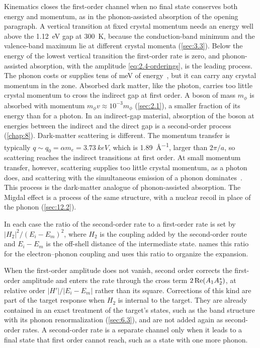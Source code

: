 Kinematics closes the first-order channel when no final state conserves both energy and momentum, as in the phonon-assisted absorption of the opening paragraph. A vertical transition at fixed crystal momentum needs an energy well above the \SI{1.12}{eV} gap at \SI{300}{K}, because the conduction-band minimum and the valence-band maximum lie at different crystal momenta (\cref{sec:3.3}). Below the energy of the lowest vertical transition the first-order rate is zero, and phonon-assisted absorption, with the amplitude \cref{eq:2.4-orderings}, is the leading process. The phonon costs or supplies tens of meV of energy~\cite[Table~I]{kahn2022searches}, but it can carry any crystal momentum in the zone. Absorbed dark matter, like the photon, carries too little crystal momentum to cross the indirect gap at first order. A boson of mass $m_\phi$ is absorbed with momentum $m_\phi v \approx 10^{-3}m_\phi$ (\cref{sec:2.1}), a smaller fraction of its energy than for a photon. In an indirect-gap material, absorption of the boson at energies between the indirect and the direct gap is a second-order process (\cref{chap:8}). Dark-matter scattering is different. The momentum transfer is typically $q \sim q_0 = \alpha m_e = \SI{3.73}{keV}$, which is \SI{1.89}{\angstrom^{-1}}, larger than $2\pi/a$, so scattering reaches the indirect transitions at first order. At small momentum transfer, however, scattering supplies too little crystal momentum, as a photon does, and scattering with the simultaneous emission of a phonon dominates~\cite[Sect.~VI]{kahn2022searches}. This process is the dark-matter analogue of phonon-assisted absorption. The Migdal effect is a process of the same structure, with a nuclear recoil in place of the phonon (\cref{sec:12.2}).

In each case the ratio of the second-order rate to a first-order rate is set by $|H_2|^2/(E_i - E_m)^2$, where $H_2$ is the coupling added by the second-order route and $E_i - E_m$ is the off-shell distance of the intermediate state.  names this ratio for the electron--phonon coupling and uses this ratio to organize the expansion.

When the first-order amplitude does not vanish, second order corrects the first-order amplitude and enters the rate through the cross term $2\operatorname{Re}(A_1A_2^*)$, at relative order $|H'|/|E_i - E_m|$ rather than its square. Corrections of this kind are part of the target response when $H_2$ is internal to the target. They are already contained in an exact treatment of the target's states, such as the band structure with its phonon renormalization (\cref{sec:6.3}), and are not added again as second-order rates. A second-order rate is a separate channel only when it leads to a final state that first order cannot reach, such as a state with one more phonon.

